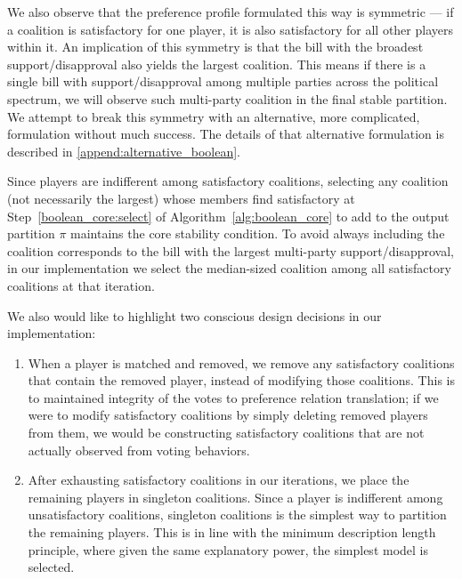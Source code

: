 We also observe that the preference profile formulated this way is symmetric ---
if a coalition is satisfactory for one player, it is also satisfactory for all
other players within it.
An implication of this symmetry is that the bill with the broadest
support/disapproval also yields the largest coalition.
This means if there is a single bill with support/disapproval among multiple
parties across the political spectrum, we will observe such multi-party
coalition in the final stable partition.
We attempt to break this symmetry with an alternative, more complicated,
formulation without much success.
The details of that alternative formulation is described in
\autoref{append:alternative_boolean}.

Since players are indifferent among satisfactory coalitions, selecting any
coalition (not necessarily the largest) whose members find satisfactory at
Step~\ref{boolean_core:select} of Algorithm~\ref{alg:boolean_core} to add to
the output partition $\pi$ maintains the core stability condition.
To avoid always including the coalition corresponds to the bill with the
largest multi-party support/disapproval, in our implementation we select the
median-sized coalition among all satisfactory coalitions at that iteration.

We also would like to highlight two conscious design decisions in our
implementation:

\begin{enumerate}
  \item When a player is matched and removed, we remove any satisfactory
    coalitions that contain the removed player, instead of modifying those
    coalitions.
    This is to maintained integrity of the votes to preference relation
    translation; if we were to modify satisfactory coalitions by simply
    deleting removed players from them, we would be constructing satisfactory
    coalitions that are not actually observed from voting behaviors.
  \item After exhausting satisfactory coalitions in our iterations, we place
    the remaining players in singleton coalitions.
    Since a player is indifferent among unsatisfactory coalitions, singleton
    coalitions is the simplest way to partition the remaining players.
    This is in line with the minimum description length principle, where given
    the same explanatory power, the simplest model is selected.
\end{enumerate}

